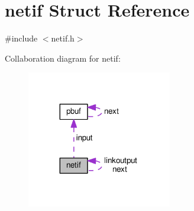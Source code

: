 \hypertarget{structnetif}{}\section{netif Struct Reference}
\label{structnetif}


{\ttfamily \#include $<$netif.\+h$>$}



Collaboration diagram for netif\+:
\nopagebreak
\begin{figure}[H]
\begin{center}
\leavevmode
\includegraphics[width=179pt]{structnetif__coll__graph}
\end{center}
\end{figure}
